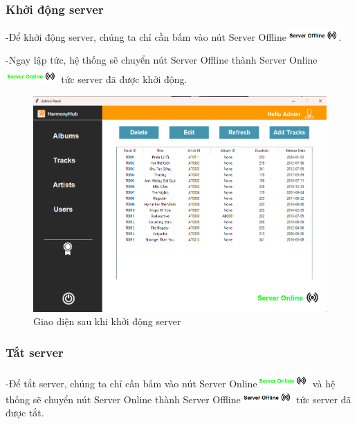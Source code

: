 \documentclass[a4paper]{article}
\begin{document}
\begin{flushleft}
	\subsubsection{Khởi động server}
	-Để khởi động server, chúng ta chỉ cần bấm vào nút Server Offline\includegraphics[width=2cm]{images/serveroffline.png}.

	-Ngay lập tức, hệ thống sẽ chuyển nút Server Offline thành Server Online\includegraphics[width=2cm]{images/serveronline.png} tức server đã được khởi động.

	\begin{figure}[h]
		\centering
		\includegraphics[width=\textwidth]{images/serveronlineform.png}
		\caption{Giao diện sau khi khởi động server}
	\end{figure}
	\subsubsection{Tắt server}
	-Để tắt server, chúng ta chỉ cần bấm vào nút Server Online\includegraphics[width=2cm]{images/serveronline.png} và hệ thống sẽ chuyển nút Server Online thành Server Offline\includegraphics[width=2cm]{images/serveroffline.png} tức server đã được tắt.
\end{flushleft}
\end{document}

